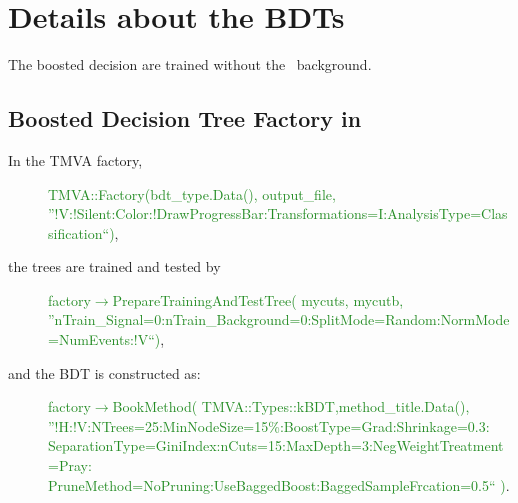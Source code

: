 \chapter{Details about the BDTs}
\label{app:BDTtechnics}
The boosted decision are trained without the \NPL\ background.
\section*{Boosted Decision Tree Factory in \STSR}
In the TMVA factory, 
\begin{description}
	\item[]\textcolor{ForestGreen}{
		TMVA::Factory(bdt\_type.Data(), output\_file, \\
		''!V:!Silent:Color:!DrawProgressBar:Transformations=I:AnalysisType=Classification``)},
\end{description}
the trees are trained and tested by 
\begin{description}
	\item[] \textcolor{ForestGreen}{factory$\rightarrow$PrepareTrainingAndTestTree( mycuts, mycutb,\\ ''nTrain\_Signal=0:nTrain\_Background=0:SplitMode=Random:NormMode=NumEvents:!V``)},
\end{description}
and the BDT is constructed as:
\begin{description}
	\item[] \textcolor{ForestGreen}{factory$\rightarrow$BookMethod( TMVA::Types::kBDT,method\_title.Data(),\\''!H:!V:NTrees=25:MinNodeSize=15\%:BoostType=Grad:Shrinkage=0.3:\\SeparationType=GiniIndex:nCuts=15:MaxDepth=3:NegWeightTreatment=Pray:\\PruneMethod=NoPruning:UseBaggedBoost:BaggedSampleFrcation=0.5`` )}.
\end{description}


